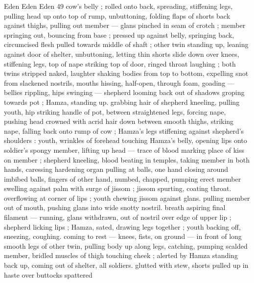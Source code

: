 Eden Eden Eden 49
cow's belly ; rolled onto back, spreading, stiffening legs, pulling
head up onto top of rump, unbuttoning, folding flaps of shorts back
against thighs, pulling out member — glans pinched in seam of
crotch ; member springing out, bouncing from base ; pressed up
against belly, springing back, circumcised flesh pulled towards
middle of shaft ; other twin standing up, leaning against door of
shelter, unbuttoning, letting thin shorts slide down over knees,
stiffening legs, top of nape striking top of door, ringed throat
laughing ; both twins stripped naked, laughter shaking bodies from
top to bottom, expelling snot from slackened nostrils, mouths
hissing, half-open, through foam, goading — bellies rippling, hips
swinging — shepherd looming back out of shadows groping towards
pot ; Hamza, standing up. grabbing hair of shepherd kneeling,
pulling youth, hip striking handle of pot, between straightened legs,
forcing nape, pushing head crowned with acrid hair down between
smooth thighs, striking nape, falling back onto rump of cow ;
Hamza's legs stiffening against shepherd's shoulders : youth,
wrinkles of forehead touching Hamza's belly, opening lips onto
soldier's spongy member, lifting up head — trace of blood marking
place of kiss on member ; shepherd kneeling, blood beating in
temples, taking member in both hands, caressing hardening organ
pulling at balls, one hand closing around imbibed balls, fingers of
other hand, numbed, chapped, pumping erect member swelling
against palm with surge of jissom ; jissom spurting, coating throat.
overflowing at corner of lips ; youth chewing jissom against glans.
pulling member out of mouth, pushing glans into wide snotty nostril.
breath aspiring final filament — running, glans withdrawn, out of
nostril over edge of upper lip ; shepherd licking lips ; Hamza, sated,
drawing legs together ; youth backing off, sneezing, coughing.
coming to rest — knees, fists, on ground — in front of long smooth
legs of other twin, pulling body up along legs, catching, pumping
scalded member, bridled muscles of thigh touching cheek ; alerted
by Hamza standing back up, coming out of shelter, all soldiers.
glutted with stew, shorts pulled up in haste over buttocks spattered

